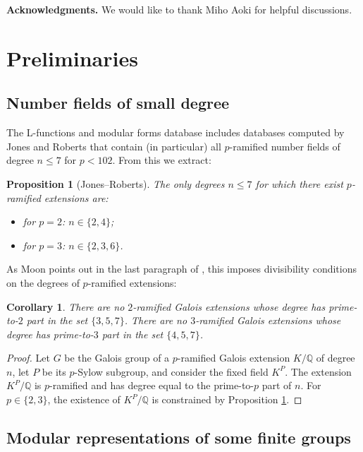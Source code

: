 \documentclass{amsart}
\newtheorem{prop}[theorem]{Proposition}
\newtheorem{corollary}[theorem]{Corollary}
\theoremstyle{definition}
\newcommand{\Q}{\mathbb{Q}}
\renewcommand{\leq}{\leqslant}
\begin{document}
\textbf{Acknowledgments.} We would like to thank Miho Aoki for helpful discussions.


\section{Preliminaries}\label{prelim}

\subsection{Number fields of small degree}

The L-functions and modular forms database \cite{LMFDB} includes databases computed by Jones and Roberts \cite{JR} that contain (in particular) all $p$-ramified number fields of degree $n\leq 7$ for $p<102$.
From this we extract:
\begin{prop}[Jones--Roberts]\label{prop:lmfdb}
  The only degrees $n\leq 7$ for which there exist $p$-ramified extensions are:
  \begin{itemize}
    \item for $p=2$: $n\in\{2,4\}$;
    \item for $p=3$: $n\in\{2,3,6\}$.
  \end{itemize}
\end{prop}

As Moon points out in the last paragraph of \cite{Mo2}, this imposes divisibility conditions on the degrees of $p$-ramified extensions:
\begin{corollary}\label{cor:lmfdb}
  There are no $2$-ramified Galois extensions whose degree has prime-to-$2$ part in the set $\{3,5,7\}$.
  There are no $3$-ramified Galois extensions whose degree has prime-to-$3$ part in the set $\{4,5,7\}$.
\end{corollary}
\begin{proof}
  Let $G$ be the Galois group of a $p$-ramified Galois extension $K/\Q$ of degree $n$, let $P$ be its $p$-Sylow subgroup, and consider the fixed field $K^P$.
  The extension $K^P/\Q$ is $p$-ramified and has degree equal to the prime-to-$p$ part of $n$.
  For $p\in\{2,3\}$, the existence of $K^P/\Q$ is constrained by Proposition \ref{prop:lmfdb}.
\end{proof}

\subsection{Modular representations of some finite groups}
\end{document}

